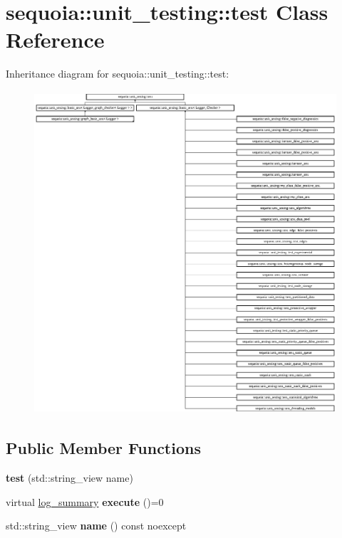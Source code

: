 \hypertarget{classsequoia_1_1unit__testing_1_1test}{}\section{sequoia\+::unit\+\_\+testing\+::test Class Reference}
\label{classsequoia_1_1unit__testing_1_1test}
Inheritance diagram for sequoia\+::unit\+\_\+testing\+::test\+:\begin{figure}[H]
\begin{center}
\leavevmode
\includegraphics[height=12.000000cm]{classsequoia_1_1unit__testing_1_1test}
\end{center}
\end{figure}
\subsection*{Public Member Functions}
\begin{DoxyCompactItemize}
\item 
\mbox{\label{classsequoia_1_1unit__testing_1_1test_ad4cd1c9ff854fdeabb2a3704e0ec11c2}} 
{\bfseries test} (std\+::string\+\_\+view name)
\item 
\mbox{\label{classsequoia_1_1unit__testing_1_1test_aa4e9e9fd33db11ad80b854f811cb24e5}} 
virtual \mbox{\hyperlink{classsequoia_1_1unit__testing_1_1log__summary}{log\+\_\+summary}} {\bfseries execute} ()=0
\item 
\mbox{\label{classsequoia_1_1unit__testing_1_1test_a18d0f61e399b1576818f38a5221e6e30}} 
std\+::string\+\_\+view {\bfseries name} () const noexcept
\end{DoxyCompactItemize}
